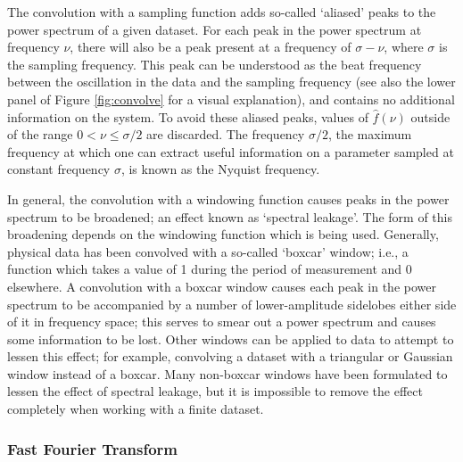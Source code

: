 \par The convolution with a sampling function adds so-called `aliased' peaks to the power spectrum of a given dataset.  For each peak in the power spectrum at frequency $\nu$, there will also be a peak present at a frequency of $\sigma-\nu$, where $\sigma$ is the sampling frequency.  This peak can be understood as the beat frequency between the oscillation in the data and the sampling frequency (see also the lower panel of Figure \ref{fig:convolve} for a visual explanation), and contains no additional information on the system.  To avoid these aliased peaks, values of $\hat{f}(\nu)$ outside of the range $0<\nu\leq\sigma/2$ are discarded.  The frequency $\sigma/2$, the maximum frequency at which one can extract useful information on a parameter sampled at constant frequency $\sigma$, is known as the Nyquist frequency.
\par In general, the convolution with a windowing function causes peaks in the power spectrum to be broadened; an effect known as `spectral leakage'.  The form of this broadening depends on the windowing function which is being used.  Generally, physical data has been convolved with a so-called `boxcar' window; i.e., a function which takes a value of 1 during the period of measurement and 0 elsewhere.  A convolution with a boxcar window causes each peak in the power spectrum to be accompanied by a number of lower-amplitude sidelobes either side of it in frequency space; this serves to smear out a power spectrum and causes some information to be lost.  Other windows can be applied to data to attempt to lessen this effect; for example, convolving a dataset with a triangular or Gaussian window instead of a boxcar.  Many non-boxcar windows have been formulated to lessen the effect of spectral leakage, but it is impossible to remove the effect completely when working with a finite dataset.

\subsubsection{Fast Fourier Transform}

